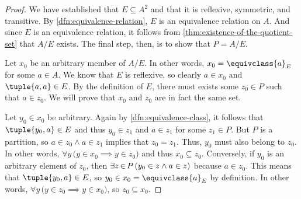 \begin{proof}
    \vspace{0.3cm}
    \noindent
    We have established that \( E \subseteq A^{2} \) and that it is reflexive, symmetric, and transitive.
    By \cref{dfn:equivalence-relation}, \( E \) is an equivalence relation on \( A \). And since \( E \)
    is an equivalence relation, it follows from \cref{thm:existence-of-the-quotient-set} that \( A / E \)
    exists. The final step, then, is to show that \( P = A / E \).

    \vspace{0.3cm}
    \noindent
    Let \( x_{0} \) be an arbitrary member of \( A / E \). In other words, \( x_{0} = \equivclass{a}_{E} \)
    for some \( a \in A \). We know that \( E \) is reflexive, so clearly \( a \in x_{0} \) and \( \tuple{a,a} \in E \).
    By the definition of \( E \), there must exists some \( z_{0} \in P \) such that \( a \in z_{0} \). We will prove that
    \( x_{0} \) and \( z_{0} \) are in fact the same set.

    \vspace{0.3cm}
    \noindent
    Let \( y_{0} \in x_{0} \) be arbitrary. Again by \cref{dfn:equivalence-class}, it follows
    that \( \tuple{y_{0},a} \in E \) and thus \( y_{0} \in z_{1} \) and \( a \in z_{1} \) for some \( z_{1} \in P \).
    But \( P \) is a partition, so \( a \in z_{0} \land a \in z_{1} \) implies that \( z_{0} = z_{1} \).
    Thus, \( y_{0} \) must also belong to \( z_{0} \). In other words, \( \forall y \, \big( y \in x_{0} \implies y \in z_{0} \big) \)
    and thus \( x_{0} \subseteq z_{0} \). Conversely, if \( y_{0} \) is an arbitrary element of \( z_{0} \),
    then \( \exists z\,{\in}\,P \, \mleft( y_{0} \in z \land a \in z \mright) \) because \( a \in z_{0} \).
    This means that \( \tuple{y_{0},a} \in E \), so \( y_{0} \in x_{0} = \equivclass{a}_{E} \) by definition.
    In other words, \( \forall y \, \big( y \in z_{0} \implies y \in x_{0} \big) \), so \( z_{0} \subseteq x_{0} \).


\end{proof}
